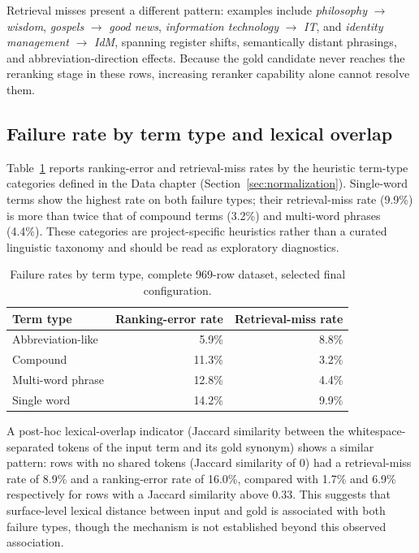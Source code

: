 Retrieval misses present a different pattern: examples include \emph{philosophy} $\rightarrow$ \emph{wisdom}, \emph{gospels} $\rightarrow$ \emph{good news}, \emph{information technology} $\rightarrow$ \emph{IT}, and \emph{identity management} $\rightarrow$ \emph{IdM}, spanning register shifts, semantically distant phrasings, and abbreviation-direction effects. Because the gold candidate never reaches the reranking stage in these rows, increasing reranker capability alone cannot resolve them.

\subsection{Failure rate by term type and lexical overlap}

Table~\ref{tab:term-type-failure} reports ranking-error and retrieval-miss rates by the heuristic term-type categories defined in the Data chapter (Section~\ref{sec:normalization}). Single-word terms show the highest rate on both failure types; their retrieval-miss rate (9.9\%) is more than twice that of compound terms (3.2\%) and multi-word phrases (4.4\%). These categories are project-specific heuristics rather than a curated linguistic taxonomy and should be read as exploratory diagnostics.

\begingroup
\footnotesize
\begin{table}[htbp]
\centering
\begin{tabular}{lrr}
\toprule
\textbf{Term type} & \textbf{Ranking-error rate} & \textbf{Retrieval-miss rate}\\
\midrule
Abbreviation-like & 5.9\% & 8.8\%\\
Compound & 11.3\% & 3.2\%\\
Multi-word phrase & 12.8\% & 4.4\%\\
Single word & 14.2\% & 9.9\%\\
\bottomrule
\end{tabular}
\caption{Failure rates by term type, complete 969-row dataset, selected final configuration.}
\label{tab:term-type-failure}
\end{table}
\endgroup

A post-hoc lexical-overlap indicator (Jaccard similarity between the whitespace-separated tokens of the input term and its gold synonym) shows a similar pattern: rows with no shared tokens (Jaccard similarity of 0) had a retrieval-miss rate of 8.9\% and a ranking-error rate of 16.0\%, compared with 1.7\% and 6.9\% respectively for rows with a Jaccard similarity above 0.33. This suggests that surface-level lexical distance between input and gold is associated with both failure types, though the mechanism is not established beyond this observed association.

